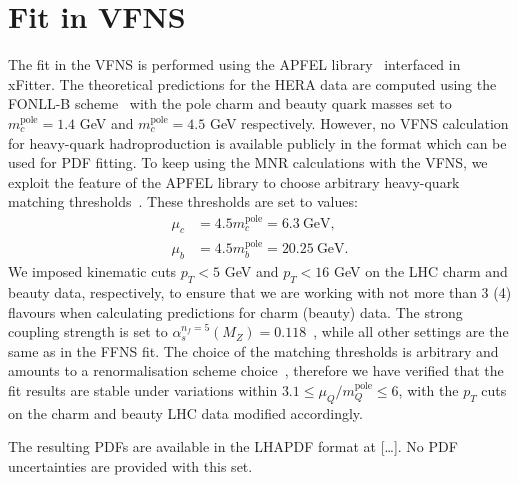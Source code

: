 \documentclass[12pt]{article}
\begin{document}




\clearpage
\appendix
\section{Fit in VFNS}
\label{sec:vfns}

The fit in the VFNS is performed using the APFEL library~\cite{Bertone:2013vaa} interfaced in xFitter.
The theoretical predictions for the HERA data are computed using the FONLL-B scheme~\cite{Forte:2010ta} with the pole charm and beauty quark masses set to $m_c^{\textrm{pole}} = 1.4$ GeV and $m_c^{\textrm{pole}} = 4.5$ GeV respectively.
However, no VFNS calculation for heavy-quark hadroproduction is available publicly in the format which can be used for PDF fitting.
To keep using the MNR calculations with the VFNS, we exploit the feature of the APFEL library to choose arbitrary heavy-quark matching thresholds~\cite{Bertone:2017ehk}. These thresholds are set to values:
\begin{equation}
\begin{aligned}
\mu_c &= 4.5m_c^{\textrm{pole}} = 6.3~\textrm{GeV},\\
\mu_b &= 4.5m_b^{\textrm{pole}} =  20.25~\textrm{GeV}.
\end{aligned}
\end{equation}
We imposed kinematic cuts $p_T < 5$ GeV and $p_T < 16$ GeV on the LHC charm and beauty data, respectively, to ensure that we are working with not more than 3 (4) flavours when calculating predictions for charm (beauty) data. The strong coupling strength is set to $\alpha_s^{n_f = 5}(M_Z) = 0.118$~\cite{Tanabashi:2018oca}, while all other settings are the same as in the FFNS fit.
The choice of the matching thresholds is arbitrary and amounts to a renormalisation scheme choice~\cite{Bertone:2017ehk}, therefore we have verified that the fit results are stable under variations within $3.1 \le \mu_Q/m_Q^{\textrm{pole}} \le 6$, with the $p_T$ cuts on the charm and beauty LHC data modified accordingly.

The resulting PDFs are available in the LHAPDF format at [\dots]. No PDF uncertainties are provided with this set.
\end{document}
